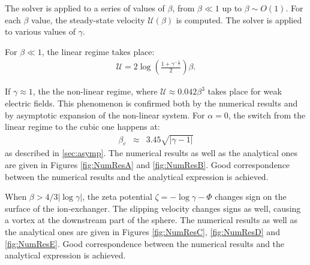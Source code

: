 \documentclass[final]{elsarticle}
\newcommand{\pars}[1]{\left(#1\right)}
\newcommand\cU{\mathscr{U}}
\begin{document}
The solver is applied to a series of values of $\beta$, from $\beta \ll 1$ up to $\beta \sim O(1)$.
For each $\beta$ value, the steady-state velocity $\cU(\beta)$ is computed. The solver
is applied to various values of $\gamma$. 

For $\beta \ll 1$, the linear regime takes place:
\begin{eqnarray*}
\cU = 2\log\pars{\frac{1 + \gamma^{-\frac{1}{2}}}{2}}\beta.
\end{eqnarray*}

If $\gamma \approx 1$, the the non-linear regime, where $\cU \approx 0.042 \beta^3$ takes place 
for weak electric fields. This phenomenon is confirmed both by the numerical
results and by asymptotic expansion of the non-linear system.
For $\alpha=0$, the switch from the linear regime to the cubic one happens at:
\begin{eqnarray*}
\beta_c & \approx & 3.45 \sqrt{|\gamma - 1|}
\end{eqnarray*}
as described in \ref{sec:asymp}.
The numerical results as well as the analytical ones are given in Figures 
\ref{fig:NumResA} and \ref{fig:NumResB}.
Good correspondence between the numerical results and the analytical expression is achieved.

When $\beta > 4/3 |\log \gamma|$, the zeta potential $\zeta = -\log \gamma - \varPhi$ 
changes sign on the surface of the ion-exchanger. The slipping velocity changes signs
as well, causing a vortex at the downstream part of the sphere.
The numerical results as well as the analytical ones are given in Figures 
\ref{fig:NumResC}, \ref{fig:NumResD} and \ref{fig:NumResE}.
Good correspondence between the numerical results and the analytical expression is achieved.
\end{document}
